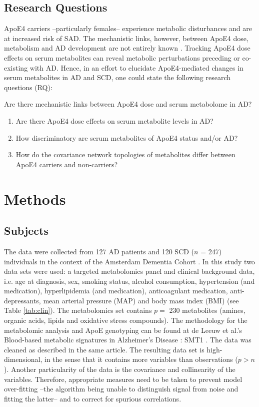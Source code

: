 \documentclass{amsart}
\begin{document}
\newpage
\subsection{Research Questions}
ApoE4 carriers --particularly females-- experience metabolic disturbances and are at increased risk of SAD. The mechanistic links, however, between ApoE4 dose, metabolism and AD development are not entirely known \cite{Fernandez-Calle2022APOEDiseases}. Tracking ApoE4 dose effects on serum metabolites can reveal metabolic perturbations preceding or co-existing with AD. Hence, in an effort to elucidate ApoE4-mediated changes in serum metabolites in AD and SCD, one could state the following research questions (RQ):

Are there mechanistic links between ApoE4 dose and serum metabolome in AD?
\begin{enumerate}
    \item Are there ApoE4 dose effects on serum metabolite levels in AD?
    \item How discriminatory are serum metabolites of ApoE4 status and/or AD?
    \item How do the covariance network topologies of metabolites differ between ApoE4 carriers and non-carriers?
\end{enumerate}

\newpage
\section{Methods}

\subsection{Subjects}
The data were collected from 127 AD patients and 120 SCD ($n$ = 247) individuals in the context of the Amsterdam Dementia Cohort \cite{VanDerFlier2018AmsterdamCare, deLeeuw2017Blood-basedDisease}. In this study two data sets were used: a targeted metabolomics panel and clinical background data, i.e. age at diagnosis, sex, smoking status, alcohol consumption, hypertension (and medication), hyperlipidemia (and medication), anticoagulant medication, anti-depressants, mean arterial pressure (MAP) and body mass index (BMI) (see Table \ref{tab:clin}). The metabolomics set contains $p =$ 230 metabolites (amines, organic acids, lipids and oxidative stress compounds). The methodology for the metabolomic analysis and ApoE genotyping can be found at de Leeuw et al.'s  Blood-based metabolic signatures in Alzheimer's Disease \cite{deLeeuw2017Blood-basedDisease}: SMT1 . The data was cleaned as described in the same article. The resulting data set is high-dimensional, in the sense that it contains more variables than observations ($p > n$). Another particularity of the data is the covariance and collinearity of the variables. Therefore, appropriate measures need to be taken to prevent model over-fitting --the algorithm being unable to distinguish signal from noise and fitting the latter--  and to correct for spurious correlations.
\end{document}
